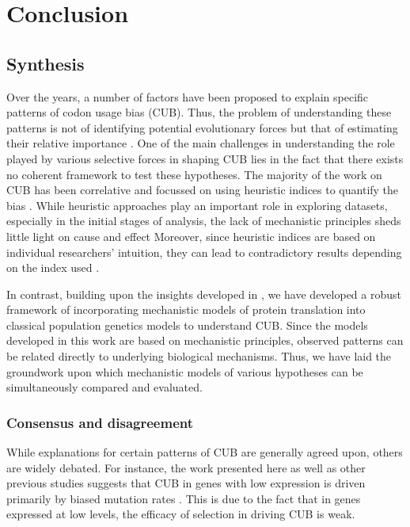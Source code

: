 \chapter{Conclusion} \label{ch:conclusion}

\section{Synthesis}
Over the years, a number of factors have been proposed to explain specific patterns of codon usage bias (CUB).
Thus, the problem of understanding these patterns is not of identifying potential evolutionary forces but that of estimating their relative importance \citep{ShahAndGilchrist10b,PlotkinAndKudla11}.
One of the main challenges in understanding the role played by various selective forces in shaping CUB lies in the fact that there exists no coherent framework to test these hypotheses.
The majority of the work on CUB has been correlative and focussed on using heuristic indices to quantify the bias \citep{BennetzenAndHall82,SharpAndLi87,Wright90}.
While heuristic approaches play an important role in exploring datasets, especially in the initial stages of analysis, the lack of mechanistic principles sheds little light on cause and effect
Moreover, since heuristic indices are based on individual researchers' intuition, they can lead to contradictory results depending on the index used \citep{StoletzkiAndEyreWalker07,GilchristEtAl09}.

In contrast, building upon the insights developed in \citep{GilchristAndWagner06,Gilchrist07}, we have developed a robust framework of incorporating mechanistic models of protein translation into classical population genetics models to understand CUB.
Since the models developed in this work are based on mechanistic principles, observed patterns can be related directly to underlying biological mechanisms.
Thus, we have laid the groundwork upon which mechanistic models of various hypotheses can be simultaneously compared and evaluated.

\subsection{Consensus and disagreement}
While explanations for certain patterns of CUB are generally agreed upon, others are widely debated.
For instance, the work presented here as well as other previous studies suggests that CUB in genes with low expression is driven primarily by biased mutation rates \citep{ChamaryEtAl06,HershbergAndPetrov08,Subramanian08}.
This is due to the fact that in genes expressed at low levels, the efficacy of selection in driving CUB is weak.

